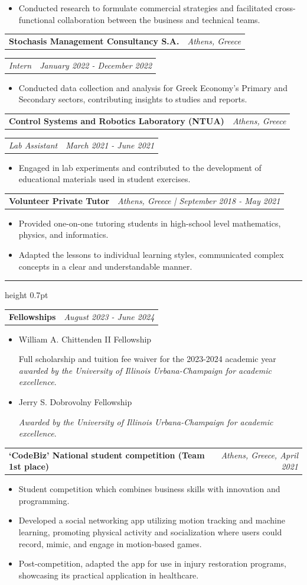 \documentclass[11pt,a4paper]{article}
\makeatletter
\newcommand{\cvsection}[1]{\par\vspace{13pt}{\bfseries #1}\par\nobreak\hrule height 0.7pt\relax\vspace{2pt}}
\newcommand{\cvrow}[2]{\noindent\begin{tabularx}{\linewidth}{@{}Xr@{}}#1 & #2\end{tabularx}\par}
\newcommand{\entrygap}{\par\vspace{3pt}}
\makeatother
\begin{document}
\begin{itemize}
\item Conducted research to formulate commercial strategies and facilitated cross-functional collaboration between the business and technical teams.
\end{itemize}
\entrygap
\cvrow{\textbf{Stochasis Management Consultancy S.A.}}{\textit{Athens, Greece}}
\cvrow{\textit{Intern}}{\textit{January 2022 - December 2022}}
\begin{itemize}
\item Conducted data collection and analysis for Greek Economy's Primary and Secondary sectors, contributing insights to studies and reports.
\end{itemize}
\entrygap
\cvrow{\textbf{Control Systems and Robotics Laboratory (NTUA)}}{\textit{Athens, Greece}}
\cvrow{\textit{Lab Assistant}}{\textit{March 2021 - June 2021}}
\begin{itemize}
\item Engaged in lab experiments and contributed to the development of educational materials used in student exercises.
\end{itemize}
\entrygap
\cvrow{\textbf{Volunteer Private Tutor}}{\textit{Athens, Greece | September 2018 - May 2021}}
\begin{itemize}
\item Provided one-on-one tutoring students in high-school level mathematics, physics, and informatics.
\item Adapted the lessons to individual learning styles, communicated complex concepts in a clear and understandable manner.
\end{itemize}

\cvsection{PROJECTS, HONORS \& AWARDS}
\cvrow{\textbf{Fellowships}}{\textit{August 2023 - June 2024}}
\begin{itemize}
\item William A. Chittenden II Fellowship\par
Full scholarship and tuition fee waiver for the 2023-2024 academic year \textit{awarded by the University of Illinois Urbana-Champaign for academic excellence}.
\item Jerry S. Dobrovolny Fellowship\par
\textit{Awarded by the University of Illinois Urbana-Champaign for academic excellence}.
\end{itemize}
\entrygap
\cvrow{\textbf{`CodeBiz' National student competition (Team 1st place)}}{\textit{Athens, Greece, April 2021}}
\begin{itemize}
\item Student competition which combines business skills with innovation and programming.
\item Developed a social networking app utilizing motion tracking and machine learning, promoting physical activity and socialization where users could record, mimic, and engage in motion-based games.
\item Post-competition, adapted the app for use in injury restoration programs, showcasing its practical application in healthcare.
\end{itemize}
\end{document}
